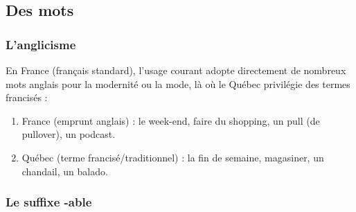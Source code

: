 \documentclass[math,code]{amznotes}
\theoremstyle{remark}
\begin{document}
\subsection*{Des mots}
\subsubsection*{L'anglicisme}

En France (français standard), l'usage courant adopte directement de nombreux mots anglais pour la modernité ou la mode, là où le Québec privilégie des termes francisés :

\begin{enumerate}
    \item France (emprunt anglais) : le week-end, faire du shopping, un pull (de pullover), un podcast.
    \item Québec (terme francisé/traditionnel) : la fin de semaine, magasiner, un chandail, un balado.
\end{enumerate}

\subsubsection*{Le suffixe -able}
\end{document}
